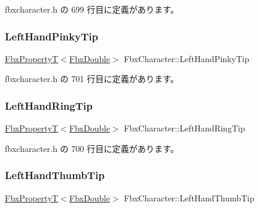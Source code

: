  fbxcharacter.\+h の 699 行目に定義があります。

\mbox{\label{class_fbx_character_a3e595eab0e31e032d0c4d47599413cce}} 
\subsubsection{\texorpdfstring{Left\+Hand\+Pinky\+Tip}{LeftHandPinkyTip}}
{\footnotesize\ttfamily \hyperlink{class_fbx_property_t}{Fbx\+PropertyT}$<$\hyperlink{fbxtypes_8h_a171e72a1c46fc15c1a6c9c31948c1c5b}{Fbx\+Double}$>$ Fbx\+Character\+::\+Left\+Hand\+Pinky\+Tip}



 fbxcharacter.\+h の 701 行目に定義があります。

\mbox{\label{class_fbx_character_a73d70325554e1716f7a4917bfb16a722}} 
\subsubsection{\texorpdfstring{Left\+Hand\+Ring\+Tip}{LeftHandRingTip}}
{\footnotesize\ttfamily \hyperlink{class_fbx_property_t}{Fbx\+PropertyT}$<$\hyperlink{fbxtypes_8h_a171e72a1c46fc15c1a6c9c31948c1c5b}{Fbx\+Double}$>$ Fbx\+Character\+::\+Left\+Hand\+Ring\+Tip}



 fbxcharacter.\+h の 700 行目に定義があります。

\mbox{\label{class_fbx_character_a0a7faf388b19788293329e3a58df0117}} 
\subsubsection{\texorpdfstring{Left\+Hand\+Thumb\+Tip}{LeftHandThumbTip}}
{\footnotesize\ttfamily \hyperlink{class_fbx_property_t}{Fbx\+PropertyT}$<$\hyperlink{fbxtypes_8h_a171e72a1c46fc15c1a6c9c31948c1c5b}{Fbx\+Double}$>$ Fbx\+Character\+::\+Left\+Hand\+Thumb\+Tip}



